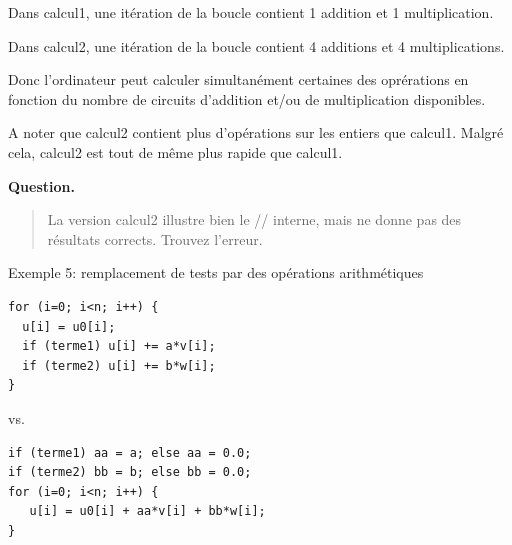 \documentclass{beamer}
\begin{document}
\begin{frame}
	
	Dans calcul1, une itération de la boucle contient 1 addition et 1 multiplication.
	
	Dans calcul2, une itération de la boucle contient 4 additions et 4 multiplications.
	
	\vfill
	Donc l'ordinateur peut calculer simultanément certaines des oprérations en fonction du nombre de circuits d'addition et/ou de multiplication disponibles.
	
	\vfill
	A noter que calcul2 contient plus d'opérations sur les entiers que calcul1.
	Malgré cela, calcul2 est tout de même plus rapide que calcul1.
	
	\vfill
	{\bf Question.}
	\begin{quote}
		La version calcul2 illustre bien le // interne, mais ne donne pas des résultats corrects. Trouvez l'erreur.
	\end{quote}
	
\end{frame}

\begin{frame}[fragile]
Exemple 5: remplacement de tests par des opérations arithmétiques

\begin{lstlisting}
for (i=0; i<n; i++) {
  u[i] = u0[i];
  if (terme1) u[i] += a*v[i];
  if (terme2) u[i] += b*w[i];
}
\end{lstlisting}

vs.
\begin{lstlisting}
if (terme1) aa = a; else aa = 0.0;
if (terme2) bb = b; else bb = 0.0;
for (i=0; i<n; i++) {
   u[i] = u0[i] + aa*v[i] + bb*w[i];
}
\end{lstlisting}

\end{frame}
\end{document}
